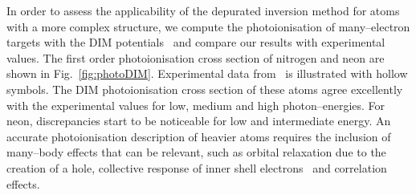 \documentclass[10pt]{article}
\begin{document}
In order to assess the applicability of the depurated inversion method
for atoms with a more complex structure, we compute the 
photoionisation of many--electron targets with the DIM 
potentials~\cite{Mendez2016} and compare our results with 
experimental values. 
The first order photoionisation cross section of nitrogen and neon 
are shown in Fig.~\ref{fig:photoDIM}. Experimental data 
from~\cite{Henke1993,Samson1990,Samson2002,Stolte2016} is illustrated 
with hollow symbols. The DIM photoionisation cross section
of these atoms agree excellently with the experimental values for 
low, medium and high photon--energies. For neon, discrepancies start 
to be noticeable for low and intermediate energy. An accurate 
photoionisation description of heavier atoms requires the inclusion 
of many--body effects that can be relevant, such as orbital 
relaxation due to the creation of a hole, collective response 
of inner shell electrons~\cite{Ederer1964} and correlation effects.
\end{document}
